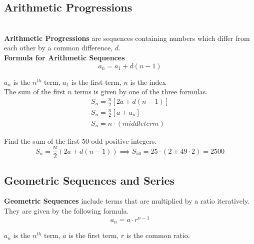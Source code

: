 \documentclass{article}
\begin{document}
    \subsection{Arithmetic Progressions} \\
    \textbf{Arithmetic Progressions} are sequences containing numbers which differ from each
    other by a common difference, $d$. \\

    \noindent \textbf{Formula for Arithmetic Sequences} \\

    \begin{equation*}
        a_n=a_1+d(n-1)
    \end{equation*}

    \noindent $a_n$ is the $n^{th}$ term, $a_1$ is the first term, $n$ is the index \\

    \noindent  The sum of the first $n$ terms is given by one of the three formulas. \\

    \begin{align*}
        S_n=\frac{n}{2}[2a+d(n-1)] \\
        S_n=\frac{n}{2}[a+a_n] \\
        S_n=n\cdot (middle term)
    \end{align*}

    \noindent Find the sum of the first 50 odd positive integers. \\

    \begin{equation*}
        S_n=\frac{n}{2}(2a+d(n-1))
        \implies
        S_{50}=25\cdot (2+49\cdot 2)=2500
    \end{equation*}

    \subsection{Geometric Sequences and Series}
    \textbf{Geometric Sequences} include terms that are multiplied by a ratio iteratively.
    They are given by the following formula. \\

    \begin{equation*}
        a_n=a\cdot r^{n-1}
    \end{equation*}

    \noindent $a_n$ is the $n^{th}$ term, $a$ is the first term, $r$ is the common ratio. \\
\end{document}
